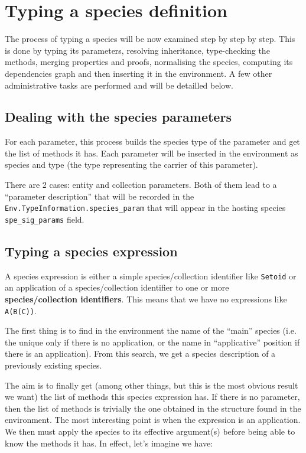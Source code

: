 \section{Typing a species definition}
The process of typing a species will be now examined step by step by
step. This is done by typing its parameters, resolving inheritance,
type-checking the methods, merging properties and proofs, normalising
the species, computing its dependencies graph and then inserting it in
the environment. A few other administrative tasks are performed and
will be detailled below.

\subsection{Dealing with the species parameters}
For each parameter, this process builds the species type of the
parameter and get the list of methods it has. Each parameter will be
inserted in the environment as species and type (the type representing
the carrier of this parameter).

\medskip
There are 2 cases: entity and collection parameters. Both of them lead
to a ``parameter description'' that will be recorded in the
{\tt Env.TypeInformation.species\_param} that will appear in the
hosting species {\tt spe\_sig\_params} field.


\subsection{Typing a species expression}
\label{typing-a-species-expression}
A species expression is either a simple species/collection identifier
like {\tt Setoid} or an application of a species/collection identifier
to one or more {\bf species/collection identifiers}. This means that
we have no expressions like {\tt A(B(C))}.

The first thing is to find in the environment the name of the ``main''
species (i.e. the unique only if there is no application, or the name
in ``applicative'' position if there is an application). From this
search, we get a species description of a previously existing species.

The aim is to finally get (among other things, but this is the most
obvious result we want) the list of methods this species expression
has. If there is no parameter, then the list of methods is trivially
the one obtained in the structure found in the environment. The most
interesting point is when the expression is an application. We then
must apply the species to its effective argument(s) before being able
to know the methods it has. In effect, let's imagine we have:

